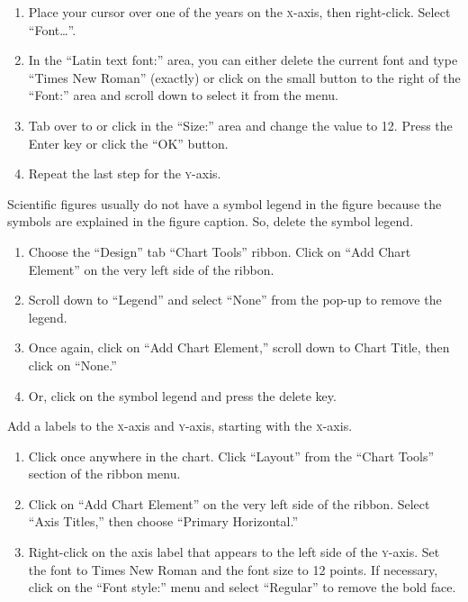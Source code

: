 \documentclass[12pt, hidelinks]{exam}
\newcommand*\axis[1]{{\scshape #1}-axis}
\begin{document}
\begin{questions}
\begin{enumerate}[resume]
	\item Place your cursor over one of the years on the \axis{x}, then right-click. Select “Font\dots”.
	
	\item In the “Latin text font:” area, you can either delete the current font and type “Times New Roman” (exactly) or click on the small button to the right of the “Font:” area and scroll down to select it from the menu. 
	
	\item Tab over to or click in the “Size:” area and change the value to 12. Press the Enter key or click the “OK” button.
	
	\item Repeat the last step for the \axis{y}.
\end{enumerate}

Scientific figures usually do not have a symbol legend in the figure because the symbols are explained in the figure caption. So, delete the symbol legend.  

\begin{enumerate}[resume]
	\item Choose the “Design” tab “Chart Tools” ribbon. Click on “Add Chart Element” on the very left side of the ribbon.  

	\item Scroll down to “Legend” and select “None” from the pop-up to remove the legend.

	\item Once again, click on “Add Chart Element,” scroll down to Chart Title, then click on “None.”

	\item Or, click on the symbol legend and press the delete key. 
\end{enumerate}

Add a labels to the \axis{x} and \axis{y}, starting with the \axis{x}.

\begin{enumerate}[resume]
	\item Click once anywhere in the chart. Click “Layout” from the “Chart Tools” section of the ribbon menu. 
	
	\item Click on “Add Chart Element” on the very left side of the ribbon.  Select “Axis Titles,” then choose “Primary Horizontal.”

	\item Right-click on the axis label that appears to the left side of the \axis{y}. Set the font to Times New Roman and the font size to 12 points. If necessary, click on the “Font style:” menu and select “Regular” to remove the bold face.


\end{enumerate}
\end{questions}
\end{document}
